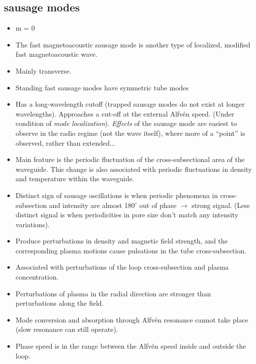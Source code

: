 \documentclass{article}
\begin{document}
\subsection{sausage modes}
\begin{itemize}
    \item m = 0
    \item The fast magnetoacoustic sausage mode is another type of
        localized, modified fast magnetoacoustic wave.
    \item Mainly transverse.
    \item Standing fast sausage modes have symmetric tube modes
    \item Has a long-wavelength cutoff (trapped sausage modes do
        not exist at longer wavelengths).
        Approaches a cut-off at the external Alfv\'en speed.
        (Under condition of \emph{mode localization}).
        \emph{Effects} of the sausage mode are easiest to observe in
        the radio regime (not the wave itself), where more of a
        ``point'' is observed, rather than extended$\ldots$
    \item Main feature is the periodic fluctuation of the cross-subsectional
        area of the waveguide. This change is also associated with
        periodic fluctuations in density and temperature within the
        waveguide.
    \item Distinct sign of sausage oscillations is when periodic
        phenomena in cross-subsection and intensity are almost
        180$^{\circ}$ out of phase $\rightarrow$ strong signal.
        (Less distinct signal is when periodicities in pore size
        don't match any intensity variations).
    \item Produce perturbations in density and magnetic field strength,
        and the corresponding plasma motions cause pulsations in the
        tube cross-subsection.
    \item Associated with perturbations of the loop cross-subsection
        and plasma concentration.
    \item Perturbations of plasma in the radial direction are stronger
        than perturbations along the field.
    \item Mode conversion and absorption through Alfv\'en resonance
        cannot take place (slow resonance can still operate).
    \item Phase speed is in the range between the Alfv\'en speed inside
        and outside the loop.
\end{itemize}
\end{document}

